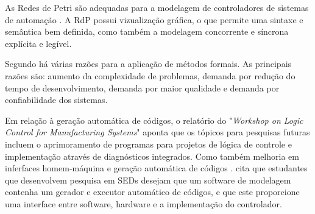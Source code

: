 As Redes de Petri s\~ao adequadas para a modelagem de controladores de sistemas de automa\c{c}\~ao \cite{gomes2007}. A RdP possui vizualiza\c{c}\~ao gr\'afica, o que permite uma sintaxe e sem\^antica bem definida, como tamb\'em a modelagem concorrente e s\'incrona expl\'icita e leg\'ivel.

Segundo \cite{Litz2000} h\'a v\'arias raz\~oes para a aplica\c{c}\~ao de m\'etodos formais. As principais raz\~oes s\~ao: aumento da complexidade de problemas, demanda por redu\c{c}\~ao do tempo de desenvolvimento, demanda por maior qualidade e demanda por confiabilidade dos sistemas.

Em rela\c{c}\~ao \`a gera\c{c}\~ao autom\'atica de c\'odigos, o relat\'orio do "\textit{Workshop on Logic Control for Manufacturing Systems}" \space aponta que os t\'opicos para pesquisas futuras incluem o aprimoramento de programas para projetos de l\'ogica de controle e implementação atrav\'es de diagn\'osticos integrados. Como tamb\'em melhoria em inferfaces homem-m\'aquina e gera\c{c}\~ao autom\'atica de c\'odigos \cite{workshop2000}. \cite{karenides} cita que estudantes que desenvolvem pesquisa em SEDs desejam que um software de modelagem contenha um gerador e executor autom\'atico de c\'odigos, e que este proporcione uma interface entre software, hardware e a implementa\c{c}\~ao do controlador.

